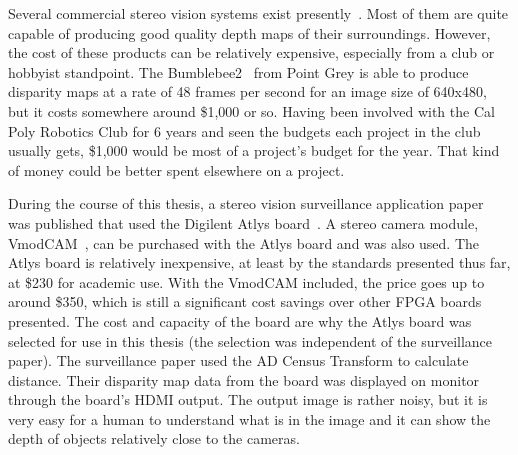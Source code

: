 Several commercial stereo vision systems exist presently~\cite{xilinxSpartan3APaper}. Most of them are quite capable of producing good quality depth maps of their surroundings. However, the cost of these products can be relatively expensive, especially from a club or hobbyist standpoint. The Bumblebee2~\cite{bumblebee} from Point Grey is able to produce disparity maps at a rate of 48 frames per second for an image size of 640x480, but it costs somewhere around \$1,000 or so. Having been involved with the Cal Poly Robotics Club for 6 years and seen the budgets each project in the club usually gets, \$1,000 would be most of a project's budget for the year. That kind of money could be better spent elsewhere on a project.

During the course of this thesis, a stereo vision surveillance application paper~\cite{surveillance} was published that used the Digilent Atlys board~\cite{atlysBoard}. A stereo camera module, VmodCAM~\cite{vmodcam}, can be purchased with the Atlys board and was also used. The Atlys board is relatively inexpensive, at least by the standards presented thus far, at \$230 for academic use. With the VmodCAM included, the price goes up to around \$350, which is still a significant cost savings over other FPGA boards presented. The cost and capacity of the board are why the Atlys board was selected for use in this thesis (the selection was independent of the surveillance paper). The surveillance paper used the AD Census Transform to calculate distance. Their disparity map data from the board was displayed on monitor through the board's HDMI output. The output image is rather noisy, but it is very easy for a human to understand what is in the image and it can show the depth of objects relatively close to the cameras.